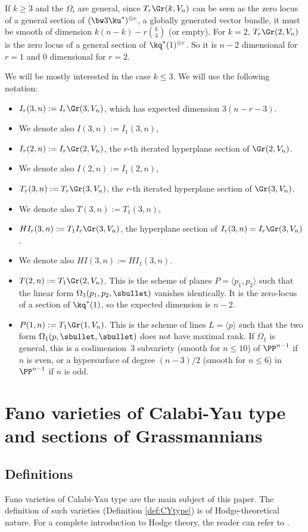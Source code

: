 If $k\ge 3$ and the $\Omega_i$ are general, since $T_r\Gr(k,V_n)$ can be seen as the zero locus of a general section of $(\bw3 \ku^*)^{\oplus r}$, a globally generated vector bundle, it must be smooth of dimension $k(n-k) - r \binom k3$ (or empty). For $k=2$, $T_r\Gr(2,V_n)$ is the zero locus of a general section of $\kq^*(1)^{\oplus r}$. So it is $n-2$ dimensional for $r=1$ and $0$ dimensional for $r=2$.

We will be mostly interested in the case $k \leq 3$. We will use the following notation:

\begin{itemize}
\item $I_r(3,n):= I_r \Gr(3,V_n)$, which has expected dimension $3(n-r-3)$.
\item[] We denote also $I(3,n):=I_1(3,n)$,
\item $I_r(2,n):= I_r \Gr(2,V_n)$, the $r$-th iterated hyperplane section of $\Gr(2,V_n)$.
\item[] We denote also $I(2,n):=I_1(2,n)$,
\item $T_r(3,n):= T_r \Gr(3,V_n)$, the $r$-th iterated hyperplane section of $\Gr(3,V_n)$.
\item[]We denote also $T(3,n):=T_1(3,n)$,
\item $HI_r(3,n):= T_1 I_r \Gr(3,V_n)$, the hyperplane section of $I_r(3,n)=I_r\Gr(3,V_n)$.
\item[]We denote also $HI(3,n):=HI_1(3,n)$.
\item $T(2,n):= T_1 \Gr(2,V_n)$. This is the scheme of planes $P=\langle p_1, p_2\rangle$ such that
the linear form $\Omega_1(p_1, p_2,\sbullet)$ vanishes identically. It is the zero-locus of a section of
$\kq^* (1)$, so the expected dimension is $n-2$.
\item $P(1,n):= T_1 \Gr(1,V_n)$. This is the scheme of lines $L=\langle p\rangle$ such that the
two form $\Omega_1(p,\sbullet,\sbullet)$ does not have maximal rank. If $\Omega_1$ is general,
this is a codimension~$3$ subvariety (smooth for $n\leq 10$) of $\PP^{n-1}$ if $n$ is even, or a
hypersurface of degree $(n-3)/2$ (smooth for $n \leq 6$) in $\PP^{n-1}$ if $n$ is odd.
\end{itemize}

\section{Fano varieties of Calabi-Yau type and sections of Grassmannians}\label{sec:CYtype}

\subsection{Definitions}
Fano varieties of Calabi-Yau type are the main subject of this paper. The definition
of such varieties (Definition \ref{def:CYtype}) is of Hodge-theoretical nature.
For a complete introduction to Hodge theory, the reader can refer to \cite{voisin-book}.

